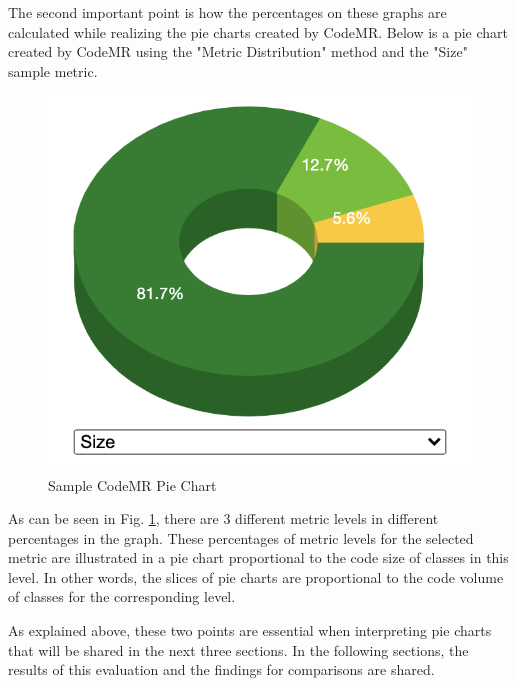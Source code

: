 The second important point is how the percentages on these graphs are calculated while realizing the pie charts created by CodeMR. Below is a pie chart created by CodeMR using the "Metric Distribution" method and the "Size" sample metric.
\begin{figure}[ht!]
    \centering
    \includegraphics[scale=0.6]{figures/sample-code-mr-chart.png}
    \caption{Sample CodeMR Pie Chart}
    \label{fig:sample-code-mr-chart}
\end{figure}
\FloatBarrier

As can be seen in Fig. \ref{fig:sample-code-mr-chart}, there are 3 different metric levels in different percentages in the graph. These percentages of metric levels for the selected metric are illustrated in a pie chart proportional to the code size of classes in this level. In other words, the slices of pie charts are proportional to the code volume of classes for the corresponding level.

As explained above, these two points are essential when interpreting pie charts that will be shared in the next three sections. In the following sections, the results of this evaluation and the findings for comparisons are shared.

